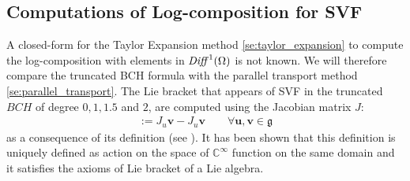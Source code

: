 \subsection{Computations of Log-composition for SVF}\label{se:log_composition_SVF}
A closed-form for the Taylor Expansion method \ref{se:taylor_expansion} to compute the log-composition with elements in $\text{\emph{Diff}}^{1}(\Omega)$ is not known. We will therefore compare the truncated BCH formula with the parallel transport method \ref{se:parallel_transport}. 
The Lie bracket that appears of SVF in the truncated $BCH$ of degree $0,1,1.5$ and $2$, are computed using the Jacobian matrix $J$:
\begin{align}
[\mathbf{u},\mathbf{v}] :=J_{u}\mathbf{v} - J_{u}\mathbf{v}  
\qquad
\forall \mathbf{u},\mathbf{v} \in \mathfrak{g}
\end{align}
as a consequence of its definition (see \cite{lee2012introduction}).
It has been shown that this definition is uniquely defined as action on the space of $\mathbb{C}^{\infty}$ function on the same domain and it satisfies the axioms of Lie bracket of a Lie algebra.\\

